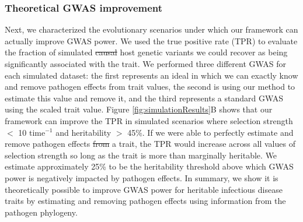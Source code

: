 \documentclass[12pt]{article} %
\providecommand{\DIFadd}[1]{{\protect\color{blue}\uwave{#1}}} %
\providecommand{\DIFdel}[1]{{\protect\color{red}\sout{#1}}}                      %
\providecommand{\DIFaddbegin}{} %
\providecommand{\DIFaddend}{} %
\providecommand{\DIFdelbegin}{} %
\providecommand{\DIFdelend}{} %
\newcommand{\DIFscaledelfig}{0.5}
\newlength{\DIFdelgraphicswidth} %
\newlength{\DIFdelgraphicsheight} %
\newcommand{\DIFaddincludegraphics}[2][]{{\color{blue}\fbox{\DIFOincludegraphics[#1]{#2}}}} %
\newcommand{\DIFdelincludegraphics}[2][]{%
\sbox{\DIFdelgraphicsbox}{\DIFOincludegraphics[#1]{#2}}%
\settoboxwidth{\DIFdelgraphicswidth}{\DIFdelgraphicsbox} %
\settoboxtotalheight{\DIFdelgraphicsheight}{\DIFdelgraphicsbox} %
\scalebox{\DIFscaledelfig}{%
\parbox[b]{\DIFdelgraphicswidth}{\usebox{\DIFdelgraphicsbox}\\[-\baselineskip] \rule{\DIFdelgraphicswidth}{0em}}\llap{\resizebox{\DIFdelgraphicswidth}{\DIFdelgraphicsheight}{%
\setlength{\unitlength}{\DIFdelgraphicswidth}%
\begin{picture}(1,1)%
\thicklines\linethickness{2pt} %
{\color[rgb]{1,0,0}\put(0,0){\framebox(1,1){}}}%
{\color[rgb]{1,0,0}\put(0,0){\line( 1,1){1}}}%
{\color[rgb]{1,0,0}\put(0,1){\line(1,-1){1}}}%
\end{picture}%
}\hspace*{3pt}}} %
} %
\DeclareRobustCommand{\DIFaddbegin}{\DIFOaddbegin \let\includegraphics\DIFaddincludegraphics} %
\DeclareRobustCommand{\DIFaddend}{\DIFOaddend \let\includegraphics\DIFOincludegraphics} %
\DeclareRobustCommand{\DIFdelbegin}{\DIFOdelbegin \let\includegraphics\DIFdelincludegraphics} %
\DeclareRobustCommand{\DIFdelend}{\DIFOaddend \let\includegraphics\DIFOincludegraphics} %
\begin{document}
\begin{doublespace}
\subsubsection*{Theoretical GWAS improvement}

Next, we characterized the evolutionary scenarios under which our framework can actually improve GWAS power. We used the true positive rate (TPR) to evaluate the fraction of simulated \DIFdelbegin \DIFdel{causal }\DIFdelend host genetic variants \DIFaddbegin \DIFadd{with direct effects }\DIFaddend we could recover as being significantly associated with the trait. We performed three different GWAS for each simulated dataset: the first represents an ideal in which we can exactly know and remove pathogen effects from trait values, the second is using our method to estimate this value and remove it, and the third represents a standard GWAS using the scaled trait value. Figure \ref{fig:simulationResults}B shows that our framework can improve the TPR in simulated scenarios where selection strength $<$ 10 time$^{-1}$ and heritability $>$ 45\%. If we were able to perfectly estimate and remove pathogen effects \DIFdelbegin \DIFdel{from }\DIFdelend \DIFaddbegin \DIFadd{on }\DIFaddend a trait, the TPR would increase across all values of selection strength so long as the trait is more than marginally heritable. We estimate approximately 25\% to be the heritability threshold above which GWAS power is negatively impacted by pathogen effects. In summary, we show it is theoretically possible to improve GWAS power for heritable infectious disease traits by estimating and removing pathogen effects using information from the pathogen phylogeny.



\end{doublespace}
\end{document}
